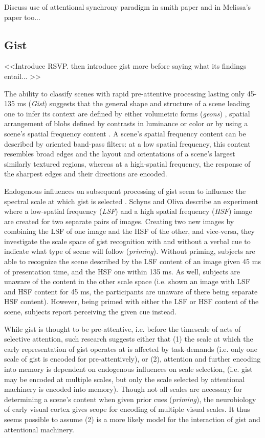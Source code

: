 Discuss use of attentional synchrony paradigm in smith paper and in Melissa's paper too...

\subsection{Gist}
\label{sec:gist}

<<Introduce RSVP. then introduce gist more before saying what its findings entail... >>

The ability to classify scenes with rapid pre-attentive processing lasting only 45-135 ms (\textit{Gist}) \cite{Potter1969,Biederman1974,Potter1976,Schyns1994,Henderson1999} suggests that the general shape and structure of a scene leading one to infer its context are defined by either volumetric forms (\textit{geons}) \cite{Biederman1987}, spatial arrangement of blobs defined by contrasts in luminance or color \cite{Schyns1994,Oliva1997} or by using a scene's spatial frequency content \cite{Oliva2001,Oliva2005}.  A scene's spatial frequency content can be described by oriented band-pass filters: at a low spatial frequency, this content resembles broad edges and the layout and orientations of a scene's largest similarly textured regions, whereas at a high-spatial frequency, the response of the sharpest edges and their directions are encoded.  

Endogenous influences on subsequent processing of gist seem to influence the spectral scale at which gist is selected \cite{Schyns1994,Oliva1997}.  Schyns and Oliva describe an experiment where a low-spatial frequency (\textit{LSF}) and a high spatial frequency (\textit{HSF}) image are created for two separate pairs of images.  Creating two new images by combining the LSF of one image and the HSF of the other, and vice-versa, they investigate the scale space of gist recognition with and without a verbal cue to indicate what type of scene will follow (\textit{priming}).  Without priming, subjects are able to recognize the scene described by the LSF content of an image given 45 ms of presentation time, and the HSF one within 135 ms.  As well, subjects are unaware of the content in the other scale space (i.e. shown an image with LSF and HSF content for 45 ms, the participants are unaware of there being separate HSF content).  However, being primed with either the LSF or HSF content of the scene, subjects report perceiving the given cue instead.  

While gist is thought to be pre-attentive, i.e. before the timescale of acts of selective attention, such research suggests either that (1) the scale at which the early representation of gist operates at is affected by task-demands (i.e. only one scale of gist is encoded for pre-attentively), or (2), attention and further encoding into memory is dependent on endogenous influences on scale selection, (i.e. gist may be encoded at multiple scales, but only the scale selected by attentional machinery is encoded into memory).  Though not all scales are necessary for determining a scene's content when given prior cues (\textit{priming}), the neurobiology of early visual cortex gives scope for encoding of multiple visual scales.  It thus seems possible to assume (2) is a more likely model for the interaction of gist and attentional machinery.

